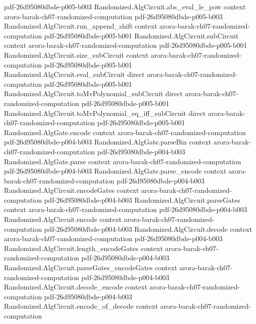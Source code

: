 \begin{theorem}
  {pdf-26d95080dbde-p005-b003}
\proofstep
  {Randomized.AlgCircuit.abs_eval_le_pow}
  {context}
  {arora-barak-ch07-randomized-computation}
  {pdf-26d95080dbde-p005-b003}
\proofstep
  {Randomized.AlgCircuit.run_append_shift}
  {context}
  {arora-barak-ch07-randomized-computation}
  {pdf-26d95080dbde-p005-b001}
\proofstep
  {Randomized.AlgCircuit.subCircuit}
  {context}
  {arora-barak-ch07-randomized-computation}
  {pdf-26d95080dbde-p005-b001}
\proofstep
  {Randomized.AlgCircuit.size_subCircuit}
  {context}
  {arora-barak-ch07-randomized-computation}
  {pdf-26d95080dbde-p005-b001}
\proofstep
  {Randomized.AlgCircuit.eval_subCircuit}
  {direct}
  {arora-barak-ch07-randomized-computation}
  {pdf-26d95080dbde-p005-b001}
\proofstep
  {Randomized.AlgCircuit.toMvPolynomial_subCircuit}
  {direct}
  {arora-barak-ch07-randomized-computation}
  {pdf-26d95080dbde-p005-b001}
\proofstep
  {Randomized.AlgCircuit.toMvPolynomial_eq_iff_subCircuit}
  {direct}
  {arora-barak-ch07-randomized-computation}
  {pdf-26d95080dbde-p005-b001}
\proofstep
  {Randomized.AlgGate.encode}
  {context}
  {arora-barak-ch07-randomized-computation}
  {pdf-26d95080dbde-p004-b003}
\proofstep
  {Randomized.AlgGate.parseBin}
  {context}
  {arora-barak-ch07-randomized-computation}
  {pdf-26d95080dbde-p004-b003}
\proofstep
  {Randomized.AlgGate.parse}
  {context}
  {arora-barak-ch07-randomized-computation}
  {pdf-26d95080dbde-p004-b003}
\proofstep
  {Randomized.AlgGate.parse_encode}
  {context}
  {arora-barak-ch07-randomized-computation}
  {pdf-26d95080dbde-p004-b003}
\proofstep
  {Randomized.AlgCircuit.encodeGates}
  {context}
  {arora-barak-ch07-randomized-computation}
  {pdf-26d95080dbde-p004-b003}
\proofstep
  {Randomized.AlgCircuit.parseGates}
  {context}
  {arora-barak-ch07-randomized-computation}
  {pdf-26d95080dbde-p004-b003}
\proofstep
  {Randomized.AlgCircuit.encode}
  {context}
  {arora-barak-ch07-randomized-computation}
  {pdf-26d95080dbde-p004-b003}
\proofstep
  {Randomized.AlgCircuit.decode}
  {context}
  {arora-barak-ch07-randomized-computation}
  {pdf-26d95080dbde-p004-b003}
\proofstep
  {Randomized.AlgCircuit.length_encodeGates}
  {context}
  {arora-barak-ch07-randomized-computation}
  {pdf-26d95080dbde-p004-b003}
\proofstep
  {Randomized.AlgCircuit.parseGates_encodeGates}
  {context}
  {arora-barak-ch07-randomized-computation}
  {pdf-26d95080dbde-p004-b003}
\proofstep
  {Randomized.AlgCircuit.decode_encode}
  {context}
  {arora-barak-ch07-randomized-computation}
  {pdf-26d95080dbde-p004-b003}
\proofstep
  {Randomized.AlgCircuit.encode_of_decode}
  {context}
  {arora-barak-ch07-randomized-computation}

\end{theorem}
